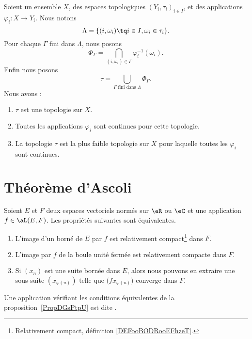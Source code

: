 \begin{proposition}     \label{PROPooGOEVooZBAOQh}
	Soient un ensemble \( X\), des espaces topologiques \( (Y_i,\tau_i)_{i\in I}\), et des applications \( \varphi_i\colon X\to Y_i\). Nous notons
	\begin{equation}
		\Lambda=\{ (i,\omega_i)\tq i\in I, \omega_i\in \tau_i \}.
	\end{equation}
	Pour chaque \( \Gamma\) fini dans \( \Lambda\), nous posons
	\begin{equation}
		\Phi_{\Gamma}=\bigcap_{(i,\omega_i)\in \Gamma}\varphi_i^{-1}(\omega_i).
	\end{equation}
	Enfin nous posons
	\begin{equation}
		\tau=\bigcup_{\Gamma\text{ fini dans } \Lambda}\Phi_{\Gamma}.
	\end{equation}
	Nous avons :
	\begin{enumerate}
		\item
		      \( \tau\) est une topologie sur \( X\).
		\item
		      Toutes les applications \( \varphi_i\) sont continues pour cette topologie.
		\item
		      La topologie \( \tau\) est la plus faible topologie sur \( X\) pour laquelle toutes les \( \varphi_i\) sont continues.
	\end{enumerate}
\end{proposition}

\section{Théorème d'Ascoli}


\begin{propositionDef} \label{PropDGsPtpU}
	Soient \( E\) et \( F\) deux espaces vectoriels normés sur \( \eR\) ou \( \eC\) et une application \( f\in\aL(E,F)\). Les propriétés suivantes sont équivalentes.
	\begin{enumerate}
		\item
		      L'image d'un borné de \( E\) par \( f\) est relativement compact\footnote{Relativement compact, définition \ref{DEFooBODRooEFhzeT}.} dans \( F\).
		\item   \label{ItemJIkpUbLii}
		      L'image par \( f\) de la boule unité fermée est relativement compacte dans \( F\).
		\item
		      Si \( (x_n)\) est une suite bornée dans \( E\), alors nous pouvons en extraire une sous-suite \( (x_{\varphi(n)})\) telle que \( \big( fx_{\varphi(n)} \big)\) converge dans \( F\).
	\end{enumerate}
	Une application vérifiant les conditions équivalentes de la proposition~\ref{PropDGsPtpU} est dite .
\end{propositionDef}

